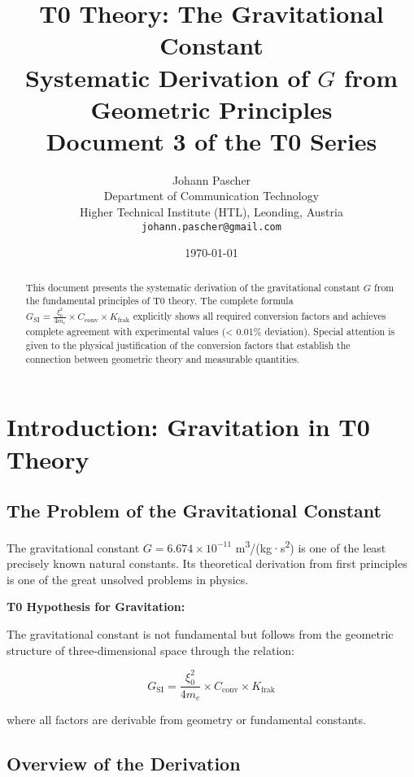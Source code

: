 \documentclass[12pt,a4paper]{article}
\title{\textbf{T0 Theory: The Gravitational Constant}\\[0.5cm]
	\large Systematic Derivation of $G$ from Geometric Principles\\[0.3cm]
	\normalsize Document 3 of the T0 Series}
\author{Johann Pascher\\
	Department of Communication Technology\\
	Higher Technical Institute (HTL), Leonding, Austria\\
	\texttt{johann.pascher@gmail.com}}
\date{\today}
\begin{document}
	
	\maketitle
	
	\begin{abstract}
		This document presents the systematic derivation of the gravitational constant $G$ from the fundamental principles of T0 theory. The complete formula $G_{\text{SI}} = \frac{\xi_0^2}{4 m_e} \times C_{\text{conv}} \times K_{\text{frak}}$ explicitly shows all required conversion factors and achieves complete agreement with experimental values (< 0.01\% deviation). Special attention is given to the physical justification of the conversion factors that establish the connection between geometric theory and measurable quantities.
	\end{abstract}
	
	\tableofcontents
	\newpage
	
	\section{Introduction: Gravitation in T0 Theory}
	
	\subsection{The Problem of the Gravitational Constant}
	
	The gravitational constant $G = 6.674 \times 10^{-11}$ m\textsuperscript{3}/(kg·s\textsuperscript{2}) is one of the least precisely known natural constants. Its theoretical derivation from first principles is one of the great unsolved problems in physics.
	
	\begin{keyresult}
		\textbf{T0 Hypothesis for Gravitation:}
		
		The gravitational constant is not fundamental but follows from the geometric structure of three-dimensional space through the relation:
		
		\begin{equation}
			\boxed{G_{\text{SI}} = \frac{\xi_0^2}{4 m_e} \times C_{\text{conv}} \times K_{\text{frak}}}
			\label{eq:G_complete}
		\end{equation}
		
		where all factors are derivable from geometry or fundamental constants.
	\end{keyresult}
	
	\subsection{Overview of the Derivation}
	
\end{document}
